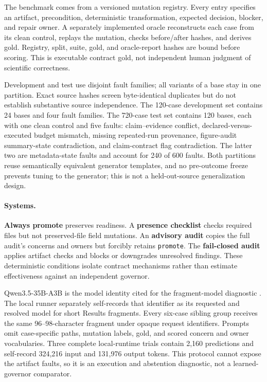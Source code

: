 \documentclass[11pt]{article}
\begin{document}
The benchmark comes from a versioned mutation registry. Every entry specifies
an artifact, precondition, deterministic transformation, expected decision,
blocker, and repair owner. A separately implemented oracle reconstructs each
case from its clean control, replays the mutation, checks before/after hashes,
and derives gold. Registry, split, suite, gold, and oracle-report hashes are
bound before scoring. This is executable contract gold, not independent human
judgment of scientific correctness.

Development and test use disjoint fault families; all variants of a base stay
in one partition. Exact source hashes screen byte-identical duplicates but do
not establish substantive source independence. The 120-case development set
contains 24 bases and four fault families. The 720-case test set contains 120
bases, each with one clean control and five faults: claim--evidence conflict,
declared-versus-executed budget mismatch, missing repeated-run provenance,
figure-audit summary-state contradiction, and claim-contract flag
contradiction. The latter two are metadata-state faults and account for 240 of
600 faults. Both partitions reuse semantically equivalent generator templates,
and no pre-outcome freeze prevents tuning to the generator; this is not a
held-out-source generalization design.

\paragraph{Systems.}
\textbf{Always promote} preserves readiness. A \textbf{presence checklist}
checks required files but not preserved-file field mutations. An
\textbf{advisory audit} copies the full audit's concerns and owners but forcibly
retains \texttt{promote}. The \textbf{fail-closed audit} applies artifact
checks and blocks or downgrades unresolved findings. These deterministic
conditions isolate contract mechanisms rather than estimate effectiveness
against an independent governor.

Qwen3.5-35B-A3B is the model identity cited for the fragment-model diagnostic
\cite{qwen3.5}. The local runner separately self-records that identifier as its
requested and resolved model for short Results fragments.
Every six-case sibling group receives the same 96--98-character fragment under
opaque request identifiers. Prompts omit case-specific paths, mutation labels,
gold, and scored concern and owner vocabularies. Three complete local-runtime
trials contain 2,160 predictions and self-record 324,216 input and 131,976
output tokens. This protocol cannot expose the artifact faults, so it is an
execution and abstention diagnostic, not a learned-governor comparator.
\end{document}
